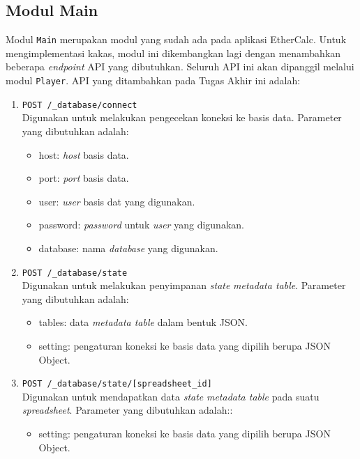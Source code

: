 \subsection{Modul Main}
Modul \texttt{Main} merupakan modul yang sudah ada pada aplikasi EtherCalc. Untuk mengimplementasi kakas, modul ini dikembangkan lagi dengan menambahkan beberapa \textit{endpoint} API yang dibutuhkan. Seluruh API ini akan dipanggil melalui modul \texttt{Player}. API yang ditambahkan pada Tugas Akhir ini adalah:
\begin{enumerate}
	\item \texttt{POST /\_database/connect} \\
	      Digunakan untuk melakukan pengecekan koneksi ke basis data. Parameter yang dibutuhkan adalah:
	      \begin{itemize}
		      \item host: \textit{host} basis data.
		      \item port: \textit{port} basis data.
		      \item user: \textit{user} basis dat yang digunakan.
		      \item password: \textit{password} untuk \textit{user} yang digunakan.
		      \item database: nama \textit{database} yang digunakan.
	      \end{itemize}

	\item \texttt{POST /\_database/state} \\
	      Digunakan untuk melakukan penyimpanan \textit{state} \textit{metadata table}. Parameter yang dibutuhkan adalah:
	      \begin{itemize}
		      \item tables: data \textit{metadata table} dalam bentuk JSON.
		      \item setting: pengaturan koneksi ke basis data yang dipilih berupa JSON Object.
	      \end{itemize}

	\item \texttt{POST /\_database/state/[spreadsheet\_id]} \\
	      Digunakan untuk mendapatkan data \textit{state} \textit{metadata table} pada suatu \textit{spreadsheet}. Parameter yang dibutuhkan adalah::
	      \begin{itemize}
		      \item setting: pengaturan koneksi ke basis data yang dipilih berupa JSON Object.
	      \end{itemize}


\end{enumerate}
